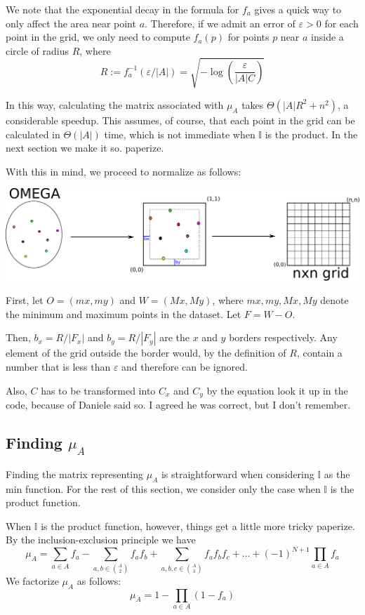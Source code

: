 \documentclass[12pt]{article}
\numberwithin{equation}{section} %
\numberwithin{figure}{section} %
\def\II{{\mathbb{I}}}
\theoremstyle{definition}
\def\tcr#1{\textcolor{MyRed}{#1}}
\begin{document}
	We note that the exponential decay in the formula for $f_a$ gives a quick way to only affect the area near point $a$. Therefore, if we admit an error of $\varepsilon > 0$ for each point in the grid, we only need to compute $f_a(p)$ for points $p$ near $a$ inside a circle of radius $R$, where
		$$R := f_a^{-1}(\varepsilon/|A|) = \sqrt{-\log\left(\frac{\varepsilon}{|A|C}\right)}$$
	
	In this way, calculating the matrix associated with $\mu_A$ takes $\Theta(|A|R^2 + n^2)$, a considerable speedup. This assumes, of course, that each point in the grid can be calculated in $\Theta(|A|)$ time, which is not immediate when $\II$ is the product. In the next section we make it so. \tcr{paperize}.
	
	With this in mind, we proceed to normalize as follows:
	\begin{center}
		\includegraphics[scale=0.5]{./continuoamalla.pdf}
	\end{center}
	
	First, let $O=(mx,my)$ and $W=(Mx,My)$, where $mx,my,Mx,My$ denote the minimum and maximum points in the dataset. Let $F=W-O$.

	Then, $b_x = R/|F_x|$ and $b_y = R/|F_y|$ are the $x$ and $y$ borders respectively. Any element of the grid outside the border would, by the definition of $R$, contain a number that is less than $\varepsilon$ and therefore can be ignored.
	
	Also, $C$ has to be transformed into $C_x$ and $C_y$ by the equation \tcr{look it up in the code}, because of \tcr{Daniele said so. I agreed he was correct, but I don't remember.}

\subsection{Finding \texorpdfstring{$\mu_A$}{mu\_A}}
Finding the matrix representing $\mu_A$ is straightforward when considering $\II$ as the min function. For the rest of this section, we consider only the case when $\II$ is the product function.

When $\II$ is the product function, however, things get a little more tricky \tcr{paperize}. By the inclusion-exclusion principle we have
	$$\mu_A = \sum_{a\in A} f_{a} - \sum_{a,b \in \binom{A}{2}} f_a f_b + \sum_{a,b,c \in \binom{A}{3} } f_a f_{b} f_{c} + \dots + (-1)^{N+1} \prod_{a\in A} f_a $$
We factorize $\mu_A$ as follows:
\begin{equation}\label{mu}\mu_A = 1-\prod_{a\in A} (1-f_a)\end{equation}
\end{document}
